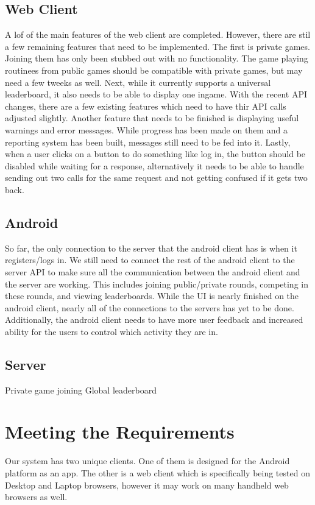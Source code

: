 \documentclass{dependencies/acm_proc_article-sp}
\begin{document}
\subsection {Web Client}
A lof of the main features of the web client are completed.
However, there are stil a few remaining features that need to be implemented.
The first is private games.
Joining them has only been stubbed out with no functionality.
The game playing routinees from public games should be compatible with private games, but may need a few tweeks as well.
Next, while it currently supports a universal leaderboard, it also needs to be able to display one ingame.
With the recent API changes, there are a few existing features which need to have thir API calls adjusted slightly.
Another feature that needs to be finished is displaying useful warnings and error messages.
While progress has been made on them and a reporting system has been built, messages still need to be fed into it.
Lastly, when a user clicks on a button to do something like log in, the button should be disabled while waiting for a response, alternatively it needs to be able to handle sending out two calls for the same request and not getting confused if it gets two back.
\subsection {Android}
So far, the only connection to the server that the android client has is when it
registers/logs in. We still need to connect the rest of the android client to
the server API to make sure all the communication between the android client
and the server are working. This includes joining public/private rounds,
competing in these rounds, and viewing leaderboards. While the UI is nearly
finished on the android client, nearly all of the connections to the servers
has yet to be done. Additionally, the android client needs to have more user
feedback and increased ability for the users to control which activity they
are in.
\subsection {Server}
Private game joining
Global leaderboard

\section {Meeting the Requirements}

Our system has two unique clients. One of them is designed for the Android platform as an app.
The other is a web client which is specifically being tested on Desktop and Laptop
browsers, however it may work on many handheld web browsers as well.
\end{document}
